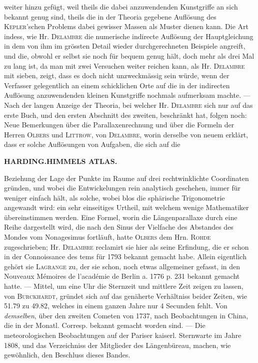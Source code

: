 weiter hinzu gefügt, weil theils die dabei anzuwendenden Kunstgriffe an sich bekannt genug sind, theils die in der Theoria gegebene Auflösung des \textsc{Kepler}'schen Problems dabei gewisser Massen als Muster dienen kann. Die Art indess, wie Hr. \textsc{Delambre} die numerische indirecte Auflösung der Hauptgleichung in dem von ihm im grössten Detail wieder durchgerechneten Beispiele angreift, und die, obwohl er selbst sie noch für bequem genug hält, doch mehr als drei Mal zu lang ist, da man mit zwei Versuchen weiter reichen kann, als Hr. \textsc{Delambre} mit sieben, zeigt, dass es doch nicht unzweckmässig sein würde, wenn der Verfasser gelegentlich an einem schicklichen Orte auf die in der indirecten Auflösung anzuwendenden kleinen Kunstgriffe nochmals aufmerksam machte. --- Nach der langen Anzeige der Theoria, bei welcher Hr. \textsc{Delambre} sich nur auf das erste Buch, und den ersten Abschnitt des zweiten, beschränkt hat, folgen noch: Neue Bemerkungen über die Parallaxenrechnung und über die Formeln der Herren \textsc{Olbers} und \textsc{Littrow}, von \textsc{Delambre}, worin derselbe von neuem erklärt, dass er solche Auflösungen von Aufgaben, die sich auf die\par
\clearpage
\noindent{}%
\makebox[12mm][l]{}%
\parbox[t]{\dimexpr\linewidth-24mm\relax}{\centering\footnotesize\bfseries HARDING.\enspace HIMMELS ATLAS.\par}%
\par\nobreak\medskip
\noindent Beziehung der Lage der Punkte im Raume auf drei rechtwinklichte Coordinaten gründen, und wobei die Entwickelungen rein analytisch geschehen, immer für weniger einfach hält, als solche, wobei blos die sphärische Trigonometrie angewandt wird: ein sehr einseitiges Urtheil, mit welchem wenige Mathematiker übereinstimmen werden. Eine Formel, worin die Längenparallaxe durch eine Reihe dargestellt wird, die nach den Sinus der Vielfache des Abstandes des Mondes vom Nonagesimus fortläuft, hatte \textsc{Olbers} dem Hrn. \textsc{Rohde} zugeschrieben; Hr. \textsc{Delambre} reclamirt sie hier als seine Erfindung, die er schon in der Connoissance des tems für 1793 bekannt gemacht habe. Allein eigentlich gehört sie \textsc{Lagrange} zu, der sie schon, noch etwas allgemeiner gefasst, in den Nouveaux Mémoires de l'académie de Berlin a. 1776 p. 231 bekannt gemacht hatte. --- Mittel, um eine Uhr die Sternzeit und mittlere Zeit zeigen zu lassen, von \textsc{Burckhardt}, gründet sich auf das genäherte Verhältniss beider Zeiten, wie 51.79 zu 49.82, welches in einem ganzen Jahre nur 4 Secunden fehlt. Von \emph{demselben}, über den zweiten Cometen von 1737, nach Beobachtungen in China, die in der Monatl. Corresp. bekannt gemacht worden sind. --- Die meteorologischen Beobachtungen auf der Pariser kaiserl. Sternwarte im Jahre 1808, und das Verzeichniss der Mitglieder des Längenbüreau, machen, wie gewöhnlich, den Beschluss dieses Bandes.
